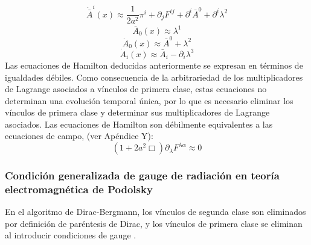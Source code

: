 \documentclass[a4paper,12pt]{article}
\begin{document}
\begin{equation}
\dot{\bar{ A}}^i(x)\approx\frac{1}{2a^2}\pi^i+\partial_jF^{ij}+\partial^i\bar{ A}^0+\partial^i\lambda^2 
\end{equation}
\begin{equation}
\dot{\bar{ A}}_0(x)\approx\lambda^1 
\end{equation}
\begin{equation}
\dot{ A}_0(x)\approx\bar{A}^0+\lambda^2 
\end{equation}
\begin{equation}
\dot{ A}_i(x)\approx\bar{A}_i-\partial_i\lambda^3 
\end{equation}
Las ecuaciones de Hamilton deducidas anteriormente se expresan en términos de igualdades débiles. Como consecuencia de la arbitrariedad de los multiplicadores de Lagrange asociados a vínculos de primera clase, estas ecuaciones no determinan una evolución temporal única, por lo que es necesario eliminar los vínculos de primera clase y determinar sus multiplicadores de Lagrange asociados. Las ecuaciones de Hamilton son débilmente equivalentes a las ecuaciones de campo, (ver Apéndice Y):
\begin{equation}
(1+2a^2\Box)\partial_{\lambda}F^{\lambda\alpha}\approx0 
\end{equation}

\subsubsection{Condición generalizada de gauge de radiación en teoría \mbox{electromagnética} de Podolsky}
En el algoritmo de Dirac-Bergmann, los vínculos de segunda clase son eliminados por definición de paréntesis de Dirac, y los vínculos de primera clase se eliminan al introducir condiciones de gauge \cite{dirac,puebla,Merilin}.
\\
\end{document}
